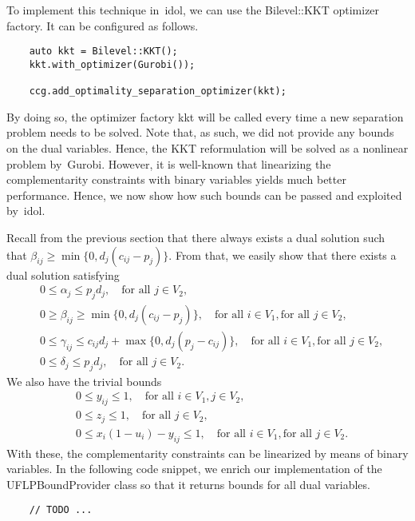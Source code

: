 To implement this technique in~\textsf{idol}, we can use the
\textsf{Bilevel::KKT} optimizer factory. It can be configured as follows. 
%
\begin{lstlisting}
    auto kkt = Bilevel::KKT();
    kkt.with_optimizer(Gurobi());

    ccg.add_optimality_separation_optimizer(kkt);
\end{lstlisting}

By doing so, the optimizer factory \textsf{kkt} will be called every time a
new separation problem needs to be solved. Note that, as such, we did not
provide any bounds on the dual variables. Hence, the KKT reformulation will be
solved as a nonlinear problem by~\textsf{Gurobi}. However, it is well-known
that linearizing the complementarity constraints with binary variables yields
much better performance. Hence, we now show how such bounds can be passed and
exploited by~\textsf{idol}.

Recall from the previous section that there always exists a dual solution such
that $\beta_{ij} \ge \min\{ 0, d_j(c_{ij} - p_j) \}$. From that, we easily show that
there exists a dual solution satisfying
\begin{align*}
    & 0 \le \alpha_j \le p_jd_j, \quad \text{for all }j\in V_2, \\
    & 0 \ge \beta_{ij} \ge \min\{ 0, d_j(c_{ij} - p_j) \}, \quad \text{for all } i\in V_1, \text{for all } j\in V_2, \\
    & 0 \le \gamma_{ij} \le c_{ij}d_j + \max\{ 0, d_j( p_j - c_{ij} ) \}, \quad \text{for all } i\in V_1, \text{for all } j\in V_2, \\
    & 0 \le \delta_j \le p_jd_j, \quad \text{for all } j\in V_2.
\end{align*}
We also have the trivial bounds 
\begin{align*}
    & 0\le y_{ij} \le 1, \quad \text{for all } i\in V_1, j\in V_2, \\
    & 0\le z_j \le 1, \quad \text{for all } j\in V_2, \\
    & 0 \le x_i(1 - u_i) - y_{ij} \le 1 , \quad \text{for all } i\in V_1, \text{for all } j\in V_2.
\end{align*}
With these, the complementarity constraints can be linearized by means of
binary variables. In the following code snippet, we enrich our implementation
of the \textsf{UFLPBoundProvider} class so that it returns bounds for all dual
variables.
%
\begin{lstlisting}
    // TODO ...
\end{lstlisting}


